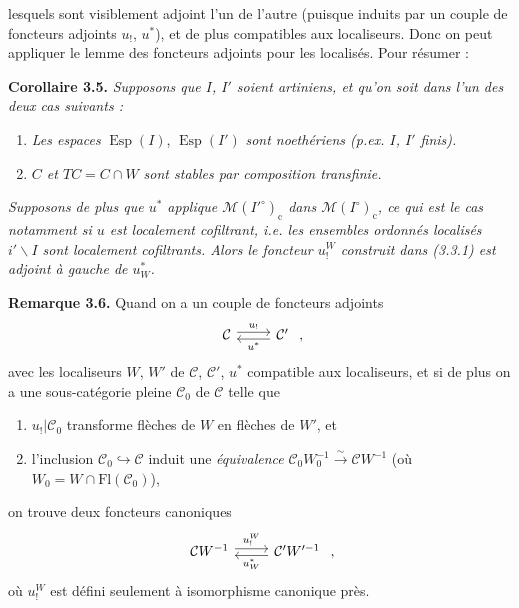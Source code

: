 \documentclass[11pt]{article}
\newcommand{\printedpage}[1]{\marginpar{\footnotesize p.~#1\ifstrequal{#1}{1}{\\[2pt]{[page 1]}}{}}}
\newcommand{\msp}[1]{\ifstrequal{#1}{page 1}{}{\marginpar{\footnotesize [#1]}}}
\newcommand{\Fl}{\mathrm{Fl}}
\newcommand{\M}{\mathcal{M}}
\newcommand{\Esp}{\operatorname{Esp}}
\begin{document}
\printedpage{29}
lesquels sont visiblement adjoint l'un de l'autre (puisque induits par un couple de foncteurs %
adjoints $u_!$, $u^*$), et de plus compatibles aux localiseurs. Donc on peut appliquer le lemme des foncteurs adjoints pour les localisés. Pour résumer :

\textbf{Corollaire 3.5.} \textit{Supposons que $I$, $I'$ soient artiniens, et qu'on soit dans l'un des deux cas suivants :}
\begin{enumerate}
\item[a)] \textit{Les espaces} $\Esp(I)$, $\Esp(I')$ \textit{sont noethériens (p.ex. $I$, $I'$ finis).}
\msp{page 58}
\item[b)] \textit{$C$ et $TC = C\cap W$ sont stables par composition transfinie.}
\end{enumerate}
\textit{Supposons de plus que $u^*$ applique $\M(I'^\circ)_{\mathrm{c}}$ dans $\M(I^\circ)_{\mathrm{c}}$, ce qui est le cas notamment si $u$ est localement cofiltrant, i.e. les ensembles ordonnés localisés $i'\backslash I$ sont localement cofiltrants. Alors le foncteur $u_!^W$ construit dans (3.3.1) est adjoint à gauche de $u_W^*$.}

\textbf{Remarque 3.6.} Quand on a un couple de foncteurs adjoints
\[
\begin{tikzcd}
\mathcal{C} \arrow[r, shift left, "u_!"] & \mathcal{C}' \arrow[l, shift left, "u^*"]
\end{tikzcd}
\ ,
\]
avec les localiseurs $W$, $W'$ de $\mathcal{C}$, $\mathcal{C}'$, $u^*$ compatible aux localiseurs, et si de plus on a une sous-catégorie pleine $\mathcal{C}_0$ de $\mathcal{C}$ telle que
\begin{enumerate}
\item[a)] $u_!|\mathcal{C}_0$ transforme flèches de $W$ en flèches de $W'$, et
\item[b)] l'inclusion $\mathcal{C}_0 \hookrightarrow \mathcal{C}$ induit une \textit{équivalence} $\mathcal{C}_0W_0^{-1} \xrightarrow{\sim} \mathcal{C}W^{-1}$ (où $W_0 = W\cap\Fl(\mathcal{C}_0)$),
\end{enumerate}
on trouve deux foncteurs canoniques
\[
\begin{tikzcd}
\mathcal{C}W^{-1} \arrow[r, shift left, "u_!^W"] & \mathcal{C}'W'^{-1} \arrow[l, shift left, "u_W^*"]
\end{tikzcd}
\ ,
\]
où $u_!^W$ est défini seulement à isomorphisme canonique près.
\end{document}
